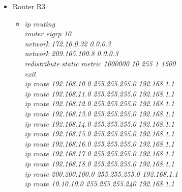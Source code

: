 \documentclass[12pt,a4paper]{report}
\begin{document}
\begin{itemize}
\begin{itemize}
\begin{itemize}
          \end{itemize}
             \item Router R3
        \begin{itemize}
         \item \textit{ip routing\\
router eigrp 10\\
network 172.16.0.32 0.0.0.3\\
network 209.165.100.8 0.0.0.3\\
redistribute static metric 1000000 10 255 1 1500\\
exit\\
ip route 192.168.10.0 255.255.255.0 192.168.1.1\\
ip route 192.168.11.0 255.255.255.0 192.168.1.1\\
ip route 192.168.12.0 255.255.255.0 192.168.1.1\\
ip route 192.168.13.0 255.255.255.0 192.168.1.1\\
ip route 192.168.14.0 255.255.255.0 192.168.1.1\\
ip route 192.168.15.0 255.255.255.0 192.168.1.1\\
ip route 192.168.16.0 255.255.255.0 192.168.1.1\\
ip route 192.168.17.0 255.255.255.0 192.168.1.1\\
ip route 192.168.18.0 255.255.255.0 192.168.1.1\\
ip route 200.200.100.0 255.255.255.0 192.168.1.1\\
ip route 10.10.10.0 255.255.255.240 192.168.1.1\\}
         

\end{itemize}
\end{itemize}
\end{itemize}
\end{document}
